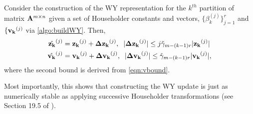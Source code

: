 \begin{lemma}\label{lem:BQR-build}
	Consider the construction of the WY representation for the $k^{th}$ partition of matrix $\mathbf{A}^{m\times n}$ given a set of Householder constants and vectors, $\{\beta_k^{(j)}\}_{j=1}^r$ and $\{\mathbf{v_k}^{(j)}$ via \cref{algo:buildWY}.
	Then, 
	\begin{align}
		\hat{\bb{z_k}}^{(j)}& = \bb{z_k}^{(j)} + \bb{\Delta z_k}^{(j)},\;\; |\bb{\Delta z_k}^{(j)}| \leq j\tilde{\gamma}_{m-(k-1)r} |\bb{z_k}^{(j)}|\label{eqn:BQR-z}\\
		\hat{\bb{v_k}}^{(j)}& = \bb{v_k}^{(j)} + \bb{\Delta v_k}^{(j)},\;\; |\bb{\Delta v_k}^{(j)}| \leq \tilde{\gamma}_{m-(k-1)r} |\bb{v_k}^{(j)}|,
	\end{align}
	where the second bound is derived from \cref{eqn:vbound}.
\end{lemma}
Most importantly, this shows that constructing the WY update is just as numerically stable as applying successive Householder transformations (see Section 19.5 of \cite{Higham2002}).
